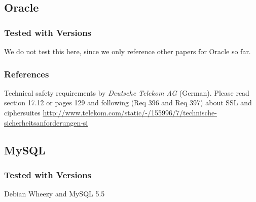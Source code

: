 \gdef\currentsectionname{DBs}

\subsection{Oracle}
\subsubsection{Tested with Versions}
\begin{itemize*}
\item We do not test this here, since we only reference other papers for Oracle so far.
\end{itemize*}


\subsubsection{References}
\begin{itemize*}
  \item Technical safety requirements by \emph{Deutsche Telekom AG} (German). Please read section 17.12 or pages 129 and following (Req 396 and Req 397) about SSL and ciphersuites \url{http://www.telekom.com/static/-/155996/7/technische-sicherheitsanforderungen-si}
\end{itemize*}






\subsection{MySQL}


\subsubsection{Tested with Versions}
\begin{itemize*}
  \item Debian Wheezy and MySQL 5.5
\end{itemize*}


